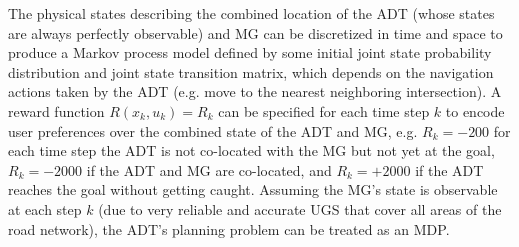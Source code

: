 The physical states describing the combined location of the ADT (whose states are always perfectly observable) and MG can be discretized in time and space to produce a Markov process model defined by some initial joint state probability distribution and joint state transition matrix, which depends on the navigation actions taken by the ADT (e.g. move to the nearest neighboring intersection).
A reward function $R(x_k,u_k) = R_k$ can be specified for each time step $k$ to encode user preferences over the combined state of the ADT and MG, e.g. $R_k = -200$ for each time step the ADT is not co-located with the MG but not yet at the goal, $R_k= -2000$ if the ADT and MG are co-located, and $R_k=+2000$ if the ADT reaches the goal without getting caught. 
Assuming the MG's state is observable at each step $k$ (due to very reliable and accurate UGS that cover all areas of the road network), the ADT's planning problem can be treated as an MDP. 



